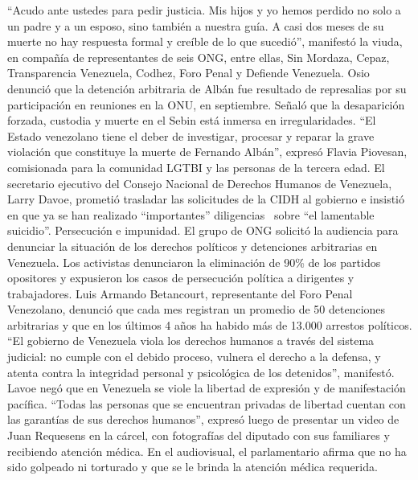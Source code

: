 \documentclass{article}%
\begin{document}
\newline%
%
“Acudo ante ustedes para pedir justicia. Mis hijos y yo hemos perdido no solo a un padre y a un esposo, sino también a nuestra guía. A casi dos meses de su muerte no hay respuesta formal y creíble de lo que sucedió”, manifestó la viuda, en compañía de representantes de seis ONG, entre ellas, Sin Mordaza, Cepaz, Transparencia Venezuela, Codhez, Foro Penal y Defiende Venezuela.%
\newline%
%
Osio denunció que la detención arbitraria de Albán fue resultado de represalias por su participación en reuniones en la ONU, en septiembre. Señaló que la desaparición forzada, custodia y muerte en el Sebin está inmersa en irregularidades.%
\newline%
%
“El Estado venezolano tiene el deber de investigar, procesar y reparar la grave violación que constituye la muerte de Fernando Albán”, expresó Flavia Piovesan, comisionada para la comunidad LGTBI y las personas de la tercera edad.%
\newline%
%
El secretario ejecutivo del Consejo Nacional de Derechos Humanos de Venezuela, Larry Davoe, prometió trasladar las solicitudes de la CIDH al gobierno e insistió en que ya se han realizado “importantes” diligencias ~sobre “el lamentable suicidio”.%
\newline%
%
Persecución e impunidad. El grupo de ONG solicitó la audiencia para denunciar la situación de los derechos políticos y detenciones arbitrarias en Venezuela.%
\newline%
%
Los activistas denunciaron la eliminación de 90\% de los partidos opositores y expusieron los casos de persecución política a dirigentes y trabajadores.%
\newline%
%
Luis Armando Betancourt, representante del Foro Penal Venezolano, denunció que cada mes registran un promedio de 50 detenciones arbitrarias y que en los últimos 4 años ha habido más de 13.000 arrestos políticos.%
\newline%
%
“El gobierno de Venezuela viola los derechos humanos a través del sistema judicial: no cumple con el debido proceso, vulnera el derecho a la defensa, y atenta contra la integridad personal y psicológica de los detenidos”, manifestó.%
\newline%
%
Lavoe negó que en Venezuela se viole la libertad de expresión y de manifestación pacífica. “Todas las personas que se encuentran privadas de libertad cuentan con las garantías de sus derechos humanos”, expresó luego de presentar un video de Juan Requesens en la cárcel, con fotografías del diputado con sus familiares y recibiendo atención médica. En el audiovisual, el parlamentario afirma que no ha sido golpeado ni torturado y que se le brinda la atención médica requerida.%
\end{document}
